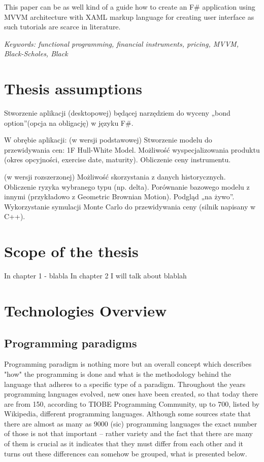     This paper can be as well kind of a guide how to create an F\# application using MVVM architecture with XAML markup language for creating user interface as such tutorials are scarce in literature.
    
    \emph{Keywords: functional programming, financial instruments, pricing, MVVM, Black-Scholes, Black}






\section{Thesis assumptions}
    Stworzenie aplikacji (desktopowej) będącej narzędziem do wyceny „bond option”(opcja na obligację) w języku F\#.
    
    W obrębie aplikacji: 
    (w wersji podstawowej)
    Stworzenie modelu do przewidywania cen: 1F Hull-White Model.
    Możliwość wyspecjalizowania produktu (okres opcyjności, exercise date, maturity).
    Obliczenie ceny instrumentu.
    
    (w wersji rozszerzonej)
    Możliwość skorzystania z danych historycznych.
    Obliczenie ryzyka wybranego typu (np. delta).
    Porównanie bazowego modelu z innymi (przykładowo z Geometric Brownian Motion).
    Podgląd „na żywo”.
    Wykorzystanie symulacji Monte Carlo do przewidywania ceny (silnik napisany w C++).

\section{Scope of the thesis}
    In chapter 1 - blabla
    In chapter 2 I will talk about blablah




\section{Technologies Overview}
\subsection{Programming paradigms}
    Programming paradigm is nothing more but an overall concept which describes "how" the programming is done and what is the methodology behind the language that adheres to a specific type of a paradigm. Throughout the years programming languages evolved, new ones have been created, so that today there are from 150, according to TIOBE Programming Community, up to 700, listed by Wikipedia, different programming languages\cite{numberOfProgrammingLanguages}. Although some sources\cite{numberOfProgrammingLanguages_hopl_info} state that there are almost as many as 9000 (sic) programming languages the exact number of those is not that important -- rather variety and the fact that there are many of them is crucial as it indicates that they must differ from each other and it turns out these differences can somehow be grouped, what is presented below.
    
